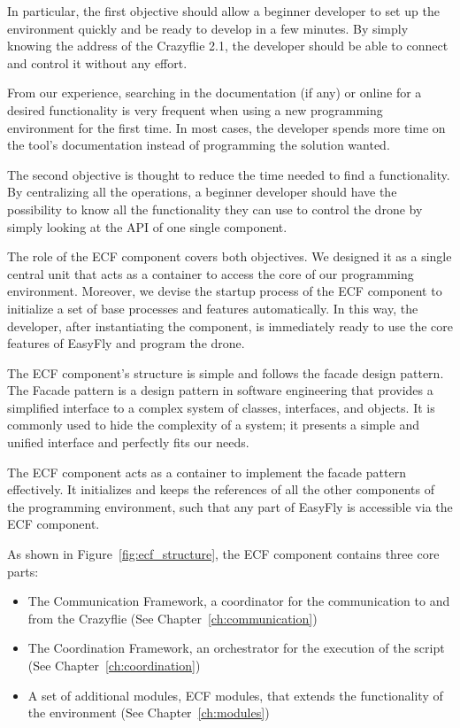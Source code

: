 In particular, the first objective should allow a beginner developer to set up the environment quickly and be ready to develop in a few minutes. 
By simply knowing the address of the Crazyflie 2.1, the developer should be able to connect and control it without any effort.

From our experience, searching in the documentation (if any) or online for a desired functionality is very frequent when using a new programming environment for the first time.
In most cases, the developer spends more time on the tool's documentation instead of programming the solution wanted.

The second objective is thought to reduce the time needed to find a functionality.
By centralizing all the operations, a beginner developer should have the possibility to know all the functionality they can use to control the drone by simply looking at the API of one single component. 

The role of the ECF component covers both objectives. 
We designed it as a single central unit that acts as a container to access the core of our programming environment.
Moreover, we devise the startup process of the ECF component to initialize a set of base processes and features automatically.
In this way, the developer, after instantiating the component, is immediately ready to use the core features of EasyFly and program the drone.

The ECF component's structure is simple and follows the facade design pattern.
The Facade pattern is a design pattern in software engineering that provides a simplified interface to a complex system of classes, interfaces, and objects. 
It is commonly used to hide the complexity of a system; it presents a simple and unified interface and perfectly fits our needs.

The ECF component acts as a container to implement the facade pattern effectively. 
It initializes and keeps the references of all the other components of the programming environment, such that any part of EasyFly is accessible via the ECF component.

\pagebreak%

As shown in Figure~\ref{fig:ecf_structure}, the ECF component contains three core parts:
\begin{itemize}
    \item The Communication Framework, a coordinator for the communication to and from the Crazyflie (See Chapter~\ref{ch:communication})
    \item The Coordination Framework, an orchestrator for the execution of the script  (See Chapter~\ref{ch:coordination})
    \item A set of additional modules, ECF modules, that extends the functionality of the environment (See Chapter~\ref{ch:modules})
\end{itemize}

